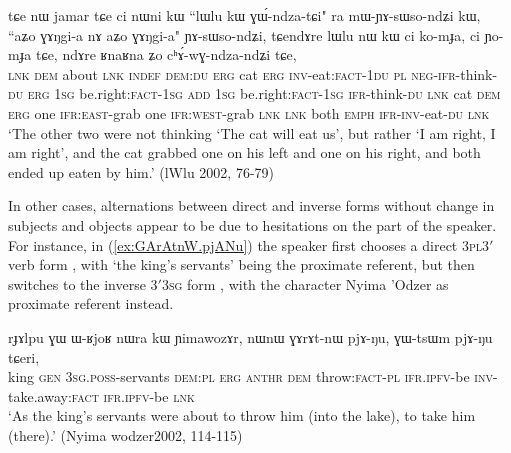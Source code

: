 \begin{exe}
\ex \label{ex:RnaRna.Zo.chAwGndzandZi}
\gll tɕe nɯ jamar tɕe ci nɯni kɯ ``lɯlu kɯ ɣɯ́-ndza-tɕi" ra mɯ-ɲɤ-sɯso-ndʑi kɯ, ``aʑo ɣɤŋgi-a nɤ aʑo ɣɤŋgi-a" ɲɤ-sɯso-ndʑi, tɕendɤre lɯlu nɯ kɯ ci ko-mɟa, ci ɲo-mɟa tɕe, ndɤre ʁnaʁna ʑo cʰɤ́-wɣ-ndza-ndʑi tɕe, \\
\textsc{lnk} \textsc{dem} about \textsc{lnk} \textsc{indef} \textsc{dem}:\textsc{du} \textsc{erg} cat \textsc{erg} \textsc{inv}-eat:\textsc{fact}-\textsc{1du} \textsc{pl} \textsc{neg}-\textsc{ifr}-think-\textsc{du} \textsc{erg} \textsc{1sg} be.right:\textsc{fact}-\textsc{1sg} \textsc{add} \textsc{1sg} be.right:\textsc{fact}-\textsc{1sg} \textsc{ifr}-think-\textsc{du} \textsc{lnk} cat \textsc{dem} \textsc{erg} one \textsc{ifr}:\textsc{east}-grab one \textsc{ifr}:\textsc{west}-grab \textsc{lnk} \textsc{lnk} both \textsc{emph} \textsc{ifr}-\textsc{inv}-eat-\textsc{du} \textsc{lnk} \\
\glt `The other two were not thinking `The cat will eat us', but rather `I am right, I am right', and the cat grabbed one on his left and one on his right, and both ended up eaten by him.' (lWlu 2002, 76-79)
\end{exe} 

In other cases, alternations between direct and inverse forms without change in subjects and objects appear to be due to hesitations on the part of the speaker. For instance, in (\ref{ex:GArAtnW.pjANu}) the speaker first chooses a direct \textsc{3pl}\fl{}3$'$ verb form , with  `the king's servants' being the proximate referent, but then switches to the inverse 3$'$\fl{}\textsc{3sg} form , with the character Nyima 'Odzer as proximate referent instead.

\begin{exe}
\ex \label{ex:GArAtnW.pjANu}
\gll  rɟɤlpu ɣɯ ɯ-ʁjoʁ nɯra kɯ ɲimawozɤr, nɯnɯ ɣɤrɤt-nɯ pjɤ-ŋu, ɣɯ-tsɯm pjɤ-ŋu tɕeri, \\
king \textsc{gen} \textsc{3sg}.\textsc{poss}-servants \textsc{dem}:\textsc{pl} \textsc{erg}  \textsc{anthr} \textsc{dem} throw:\textsc{fact}-\textsc{pl} \textsc{ifr}.\textsc{ipfv}-be \textsc{inv}-take.away:\textsc{fact} \textsc{ifr}.\textsc{ipfv}-be \textsc{lnk} \\
\glt `As the king's servants were about to throw him (into the lake), to take him (there).' (Nyima wodzer2002, 114-115)
\end{exe}


